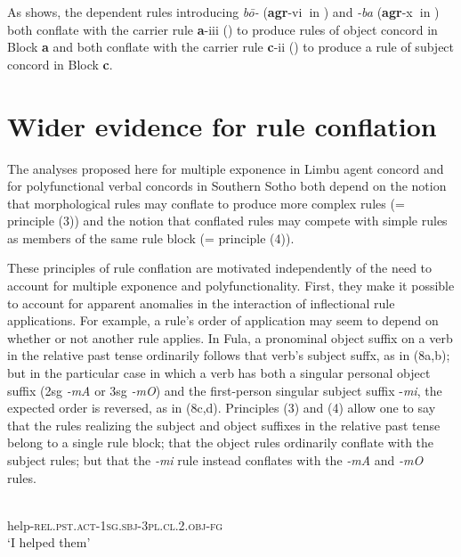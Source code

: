 \documentclass[output=paper,
modfonts
]{LSP/langsci}
\begin{document}
As  shows, the dependent rules introducing \textit{b\=o\nobreakdash-} (\textbf{agr}\nobreakdash-vi\textbf{~}in )\textit{} and \textit{\nobreakdash-ba} (\textbf{agr}\nobreakdash-x\textbf{~}in ) both conflate with the carrier rule \textbf{a}\nobreakdash-iii () to produce rules of object concord in Block \textbf{a} and both conflate with the carrier rule \textbf{c}\nobreakdash-ii () to produce a rule of subject concord in Block \textbf{c}.  

\section{Wider evidence for rule conflation}
The analyses proposed here for multiple exponence in Limbu agent concord and for polyfunctional verbal concords in Southern Sotho both depend on the notion that morphological rules may conflate to produce more complex rules (= principle (3)) and the notion that conflated rules may compete with simple rules as members of the same rule block (= principle (4)).  

These principles of rule conflation are motivated independently of the need to account for multiple exponence and polyfunctionality.  First, they make it possible to account for apparent anomalies in the interaction of inflectional rule applications.  For example, a rule’s order of application may seem to depend on whether or not another rule applies. In Fula, a pronominal object suffix on a verb in the relative past tense ordinarily follows that verb’s subject suffx, as in (8a,b); but in the particular case in which a verb has both a singular personal object suffix (2sg \textit{\nobreakdash-mA} or 3sg \textit{\nobreakdash-mO}) and the first\nobreakdash-person singular subject suffix \nobreakdash-\textit{mi}, the expected order is reversed, as in (8c,d).  Principles (3) and (4) allow one to say that the rules realizing the subject and object suffixes in the relative past tense belong to a single rule block; that the object rules ordinarily conflate with the subject rules; but that the \textit{\nobreakdash-mi} rule instead conflates with the \textit{\nobreakdash-mA} and \textit{\nobreakdash-mO} rules.  


\ea
	\ea
	\\
	{help\nobreakdash-\textsc{rel.pst.act}\textsc{\nobreakdash-1sg.sbj\nobreakdash-3pl.}\textsc{cl.2.obj}\textsc{\nobreakdash-fg}}\\
	\glt `I helped them'
	
\end{document}
